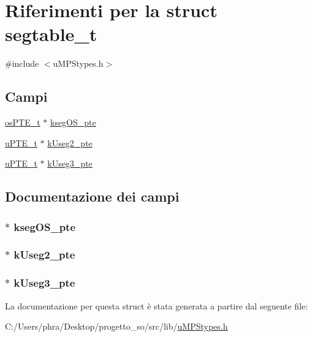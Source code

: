 \hypertarget{structsegtable__t}{\section{Riferimenti per la struct segtable\-\_\-t}
\label{structsegtable__t}
}


{\ttfamily \#include $<$u\-M\-P\-Stypes.\-h$>$}

\subsection*{Campi}
\begin{DoxyCompactItemize}
\item 
\hyperlink{structos_p_t_e__t}{os\-P\-T\-E\-\_\-t} $\ast$ \hyperlink{structsegtable__t_a1d48bd3f0868624788be5defea8cf68c}{kseg\-O\-S\-\_\-pte}
\item 
\hyperlink{structu_p_t_e__t}{u\-P\-T\-E\-\_\-t} $\ast$ \hyperlink{structsegtable__t_ae2deede0df78cd657e24fcb269a912d8}{k\-Useg2\-\_\-pte}
\item 
\hyperlink{structu_p_t_e__t}{u\-P\-T\-E\-\_\-t} $\ast$ \hyperlink{structsegtable__t_a84be0c4e94b0b3c84db8a3a5b742688f}{k\-Useg3\-\_\-pte}
\end{DoxyCompactItemize}


\subsection{Documentazione dei campi}
\hypertarget{structsegtable__t_a1d48bd3f0868624788be5defea8cf68c}{
\subsubsection[{kseg\-O\-S\-\_\-pte}]{$\ast$ kseg\-O\-S\-\_\-pte}}\label{structsegtable__t_a1d48bd3f0868624788be5defea8cf68c}
\hypertarget{structsegtable__t_ae2deede0df78cd657e24fcb269a912d8}{
\subsubsection[{k\-Useg2\-\_\-pte}]{$\ast$ k\-Useg2\-\_\-pte}}\label{structsegtable__t_ae2deede0df78cd657e24fcb269a912d8}
\hypertarget{structsegtable__t_a84be0c4e94b0b3c84db8a3a5b742688f}{
\subsubsection[{k\-Useg3\-\_\-pte}]{$\ast$ k\-Useg3\-\_\-pte}}\label{structsegtable__t_a84be0c4e94b0b3c84db8a3a5b742688f}


La documentazione per questa struct è stata generata a partire dal seguente file\-:\begin{DoxyCompactItemize}
\item 
C\-:/\-Users/phra/\-Desktop/progetto\-\_\-so/src/lib/\hyperlink{u_m_p_stypes_8h}{u\-M\-P\-Stypes.\-h}\end{DoxyCompactItemize}
